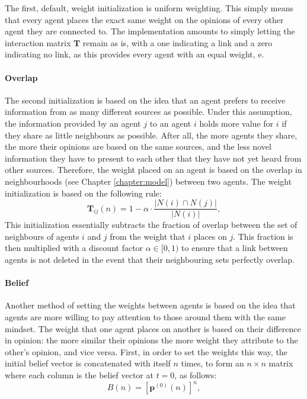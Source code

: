 \documentclass[a4paper, 12pt]{report}
\newcommand{\T}{\bm{T}}
\begin{document}
The first, default, weight initialization is uniform weighting. This simply means that every agent places the exact same weight on the opinions of every other agent they are connected to. The implementation amounts to simply letting the interaction matrix $\T$ remain as is, with a one indicating a link and a zero indicating no link, as this provides every agent with an equal weight, e.

\paragraph{Overlap}

The second initialization is based on the idea that an agent prefers to receive information from as many different sources as possible. Under this assumption, the information provided by an agent $j$ to an agent $i$ holds more value for $i$ if they share as little neighbours as possible. After all, the more agents they share, the more their opinions are based on the same sources, and the less novel information they have to present to each other that they have not yet heard from other sources. Therefore, the weight placed on an agent is based on the overlap in neighbourhoods (see Chapter \ref{chapter:model}) between two agents. The weight initialization is based on the following rule:
\begin{equation*}
    \T_{ij}(n) = 1 - \alpha \cdot \frac{|N(i) \cap N(j)|}{|N(i)|},
\end{equation*}
This initialization essentially subtracts the fraction of overlap between the set of neighbours of agents $i$ and $j$ from the weight that $i$ places on $j$. This fraction is then multiplied with a discount factor $\alpha \in [0, 1)$ to ensure that a link between agents is not deleted in the event that their neighbouring sets perfectly overlap. 

\paragraph{Belief}

Another method of setting the weights between agents is based on the idea that agents are more willing to pay attention to those around them with the same mindset. The weight that one agent places on another is based on their difference in opinion: the more similar their opinions the more weight they attribute to the other's opinion, and vice versa. First, in order to set the weights this way, the initial belief vector is concatenated with itself $n$ times, to form an $n \times n$ matrix where each column is the belief vector at $t=0$, as follows:
\begin{equation*}
    B(n) = [\bm{p}^{(0)}(n)]^{n},
\end{equation*}
\end{document}
